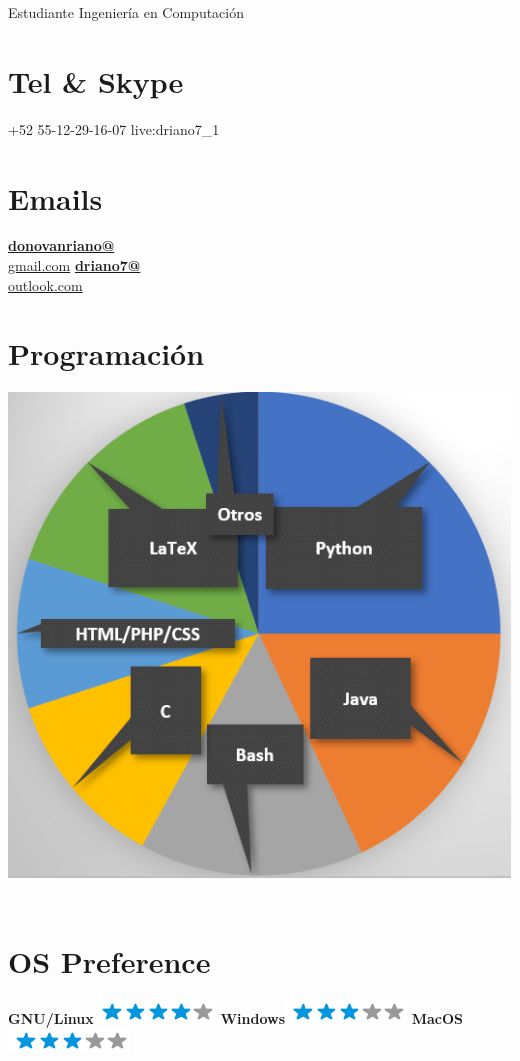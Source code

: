 \documentclass[]{friggeri-cv}
\begin{document}
      {Estudiante Ingeniería en Computación }
      

\begin{aside}
  \section{Tel \& Skype}
    +52 55-12-29-16-07
    live:driano7\_1
    ~
  \section{Emails}
    \href{mailto:donovanriano@gmail.com}{\textbf{donovanriano@}\\gmail.com}
    \href{mailto:driano7@outlook.com}{\textbf{driano7@}\\outlook.com}
    ~
  \section{Programación}
    \includegraphics[scale=0.28]{L1.png}
    ~
  \section{OS Preference}
    \textbf{GNU/Linux}\includegraphics[scale=0.40]{img/4stars.png}
    \textbf{Windows}\includegraphics[scale=0.40]{img/3stars.png}
    \textbf{MacOS}\includegraphics[scale=0.40]{img/3stars.png}
    ~

\end{aside}
\end{document}
